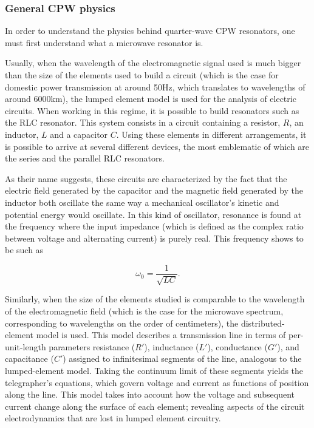 \documentclass[12pt, a4paper]{article}
\begin{document}
\subsubsection{General CPW physics} \label{GeneralCPW}

In order to understand the physics behind quarter-wave CPW resonators, one must first understand what a microwave resonator is.

Usually, when the wavelength of the electromagnetic signal used is much bigger than the size of the elements used to build a circuit (which is the case for domestic power transmission at around 50Hz, which translates to wavelengths of around 6000km), the lumped element model is used for the analysis of electric circuits. When working in this regime, it is possible to build resonators such as the RLC resonator. This system consists in a circuit containing a resistor, $R$, an inductor, $L$ and a capacitor $C$. Using these elements in different arrangements, it is possible to arrive at several different devices, the most emblematic of which are the series and the parallel RLC resonators. 

As their name suggests, these circuits are characterized by the fact that the electric field generated by the capacitor and the magnetic field generated by the inductor both oscillate the same way a mechanical oscillator's kinetic and potential energy would oscillate. In this kind of oscillator, resonance is found at the frequency where the input impedance (which is defined as the complex ratio between voltage and alternating current) is purely real. This frequency shows to be such as

\begin{equation}
\label{lumpedresonance}
    \omega_0 = \frac{1}{\sqrt{LC}}.
\end{equation}

Similarly, when the size of the elements studied is comparable to the wavelength of the electromagnetic field (which is the case for the microwave spectrum, corresponding to wavelengths on the order of centimeters), the distributed-element model is used. This model describes a transmission line in terms of per-unit-length parameters resistance ($R'$), inductance ($L'$), conductance ($G'$), and capacitance ($C'$) assigned to infinitesimal segments of the line, analogous to the lumped-element model. Taking the continuum limit of these segments yields the telegrapher's equations, which govern voltage and current as functions of position along the line. This model takes into account how the voltage and subsequent current change along the surface of each element; revealing aspects of the circuit electrodynamics that are lost in lumped element circuitry.
\end{document}
